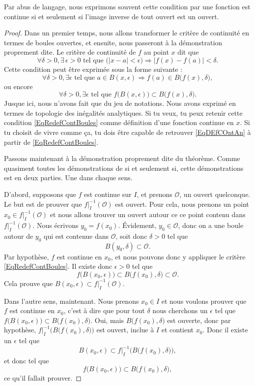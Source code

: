 \documentclass[a4paper,12pt]{book}
\theoremstyle{mes_exemples}	\newtheorem{exemple}[numtho]{Exemple}
\theoremstyle{mes_tho}
\newcommand{\mO}{\mathcal{O}}
\begin{document}
Par abus de langage, nous exprimons souvent cette condition par \og une fonction est continue si et seulement si l'image inverse de tout ouvert est un ouvert\fg.

\begin{proof}

Dans un premier temps, nous allons transformer le critère de continuité en termes de boules ouvertes, et ensuite, nous passeront à la démonstration proprement dite. Le critère de continuité de $f$ au point $x$ dit que
\begin{equation}		\label{EqDEfCOntAn}
  \forall \delta>0,\exists\,\epsilon>0\text{ tel que }\big( | x-a |< \epsilon \big)\Rightarrow| f(x)-f(a) |<\delta.
\end{equation}
Cette condition peut être exprimée sous la forme suivante :
\[ 
  \forall \delta>0,\exists\epsilon\text{ tel que } a\in B(x,\epsilon)\Rightarrow f(a)\in B\big( f(x),\delta \big),
\]
ou encore
\begin{equation}		\label{EqRedefContBoules}
  \forall \delta>0,\exists\epsilon\text{ tel que } f\big( B(x,\epsilon) \big)\subset B\big( f(x),\delta \big).
\end{equation}
Jusque ici, nous n'avons fait que du jeu de notations. Nous avons exprimé en termes de topologie des inégalités analytiques. Si tu veux, tu peux retenir cette condition \eqref{EqRedefContBoules} comme définition d'une fonction continue en $x$. Si tu choisit de vivre comme ça, tu dois être capable de retrouver \eqref{EqDEfCOntAn} à partir de \eqref{EqRedefContBoules}.
 
Passons maintenant à la démonstration proprement dite du théorème. Comme quasiment toutes les démonstrations de \og si et seulement si\fg, cette démonstrations est en deux parties. Une dans chaque sens.

D'abord, supposons que $f$ est continue sur $I$, et prenons $\mO$, un ouvert quelconque. Le but est de prouver que $f|_I^{-1}(\mO)$ est ouvert. Pour cela, nous prenons un point $x_0\in f|_I^{-1}(\mO)$ et nous allons trouver un ouvert autour ce ce point contenu dans $f|_I^{-1}(\mO)$. Nous écrivons $y_0=f(x_0)$. Évidement, $y_0\in\mO$, donc on a une boule autour de $y_0$ qui est contenue dans $\mO$, soit donc $\delta>0$ tel que
\[  
  B(y_0,\delta)\subset\mO.
\]
Par hypothèse, $f$ est continue en $x_0$, et nous pouvons donc y appliquer le critère \eqref{EqRedefContBoules}. Il existe donc $\epsilon>0$ tel que 
\[ 
  f\big( B(x_0,\epsilon) \big)\subset B\big( f(x_0),\delta \big)\subset\mO.
\]
Cela prouve que $B(x_0,\epsilon)\subset f|_I^{-1}(\mO)$.

Dans l'autre sens, maintenant. Nous prenons $x_0\in I$ et nous voulons prouver que $f$ est continue en $x_0$, c'est à dire que pour tout $\delta$ nous cherchons un $\epsilon$ tel que $f\big( B(x_0,\epsilon) \big)\subset B\big( f(x_0),\delta \big)$. Oui, mais $B\big( f(x_0),\delta \big)$ est ouverte, donc par hypothèse, $f|_I^{-1}\Big( B\big( f(x_0),\delta \big) \Big)$ est ouvert, inclue à $I$ et contient $x_0$. Donc il existe un $\epsilon$ tel que
\[ 
  B(x_0,\epsilon)\subset f|_I^{-1}\Big( B\big( f(x_0),\delta \big) \Big),
\]
et donc tel que 
\[ 
  f\big( B(x_0,\epsilon) \big)\subset B\big( f(x_0),\delta \big),
\]
ce qu'il fallait prouver.
\end{proof}
\end{document}
